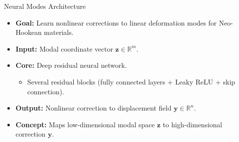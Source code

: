 \documentclass{beamer}
\begin{document}
\begin{frame}{Neural Modes Architecture}
    \begin{itemize}
        \item \textbf{Goal:} Learn nonlinear corrections to linear deformation modes for Neo-Hookean materials.
        \item \textbf{Input:} Modal coordinate vector \( \bm{z} \in \mathbb{R}^m \).
        \item \textbf{Core:} Deep residual neural network.
        \begin{itemize}
            \item Several residual blocks (fully connected layers + Leaky ReLU + skip connection).
        \end{itemize}
        \item \textbf{Output:} Nonlinear correction to displacement field \( \bm{y} \in \mathbb{R}^n \).
        \item \textbf{Concept:} Maps low-dimensional modal space \(\bm{z}\) to high-dimensional correction \(\bm{y}\).
    \end{itemize}
    \begin{center}
    \end{center}
\end{frame}
\end{document}
